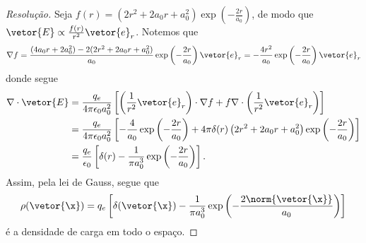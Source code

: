 \begin{proof}[Resolução]
    Seja \(f(r) = \left(2r^2 + 2a_0 r + a_0^2\right)\exp\left(-\frac{2r}{a_0}\right)\), de modo que \(\vetor{E} \propto \frac{f(r)}{r^2} \vetor{e}_r\). Notemos que
    \begin{equation*}
        \nabla f = \frac{(4a_0r + 2a_0^2) - 2 (2r^2 + 2a_0r + a_0^2)}{a_0}\exp\left(-\frac{2r}{a_0}\right)\vetor{e}_r = -\frac{4r^2}{a_0} \exp\left(-\frac{2r}{a_0}\right)\vetor{e}_r
    \end{equation*}
    donde segue
    \begin{align*}
        \nabla\cdot\vetor{E} &= \frac{q_e}{4\pi \epsilon_0 a_0^2} \left[\left(\frac{1}{r^2}\vetor{e}_r\right)\cdot \nabla f + f \nabla \cdot \left(\frac{1}{r^2}\vetor{e}_r\right)\right]\\
                             &= \frac{q_e}{4\pi \epsilon_0 a_0^2} \left[-\frac{4}{a_0}\exp\left(-\frac{2r}{a_0}\right) + 4\pi \delta(r)\left(2r^2 + 2a_0 r + a_0^2\right)\exp\left(-\frac{2r}{a_0}\right)\right]\\
                             &= \frac{q_e}{\epsilon_0}\left[\delta(r) - \frac{1}{\pi a_0^3}\exp\left(-\frac{2r}{a_0}\right)\right].
    \end{align*}
    Assim, pela lei de Gauss, segue que
    \begin{equation*}
        \rho(\vetor{\x}) = q_e\left[\delta(\vetor{\x}) - \frac{1}{\pi a_0^3}\exp\left(-\frac{2\norm{\vetor{\x}}}{a_0}\right)\right]
    \end{equation*}
    é a densidade de carga em todo o espaço.


\end{proof}
